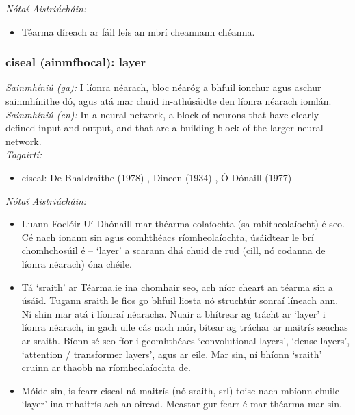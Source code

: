  \noindent \textit{Nótaí Aistriúcháin:}
\begin{itemize}
	\item Téarma díreach ar fáil leis an mbrí cheannann chéanna.
\end{itemize}


\subsubsection*{ciseal (ainmfhocal): layer}
 \noindent \textit{Sainmhíniú (ga):} I líonra néarach, bloc néaróg a bhfuil ionchur agus aschur sainmhínithe dó, agus atá mar chuid in-athúsáidte den líonra néarach iomlán.
\\
 \noindent \textit{Sainmhíniú (en):} In a neural network, a block of neurons that have clearly-defined input and output, and that are a building block of the larger neural network.
\\
 \noindent \textit{Tagairtí:}
\begin{itemize}
	\item ciseal: De Bhaldraithe (1978) \cite{de-bhaldraithe}, Dineen (1934) \cite{dineen}, Ó Dónaill (1977) \cite{odonaill}
\end{itemize}

 \noindent \textit{Nótaí Aistriúcháin:}
\begin{itemize}
	\item Luann Foclóir Uí Dhónaill mar théarma eolaíochta (sa mbitheolaíocht) é seo. Cé nach ionann sin agus comhthéacs ríomheolaíochta, úsáidtear le brí chomhchosúil é -- `layer' a scarann dhá chuid de rud (cill, nó codanna de líonra néarach) óna chéile.
	\item Tá `sraith' ar Téarma.ie ina chomhair seo, ach níor cheart an téarma sin a úsáid. Tugann sraith le fios go bhfuil liosta nó struchtúr sonraí líneach ann. Ní shin mar atá i líonraí néaracha. Nuair a bhítrear ag trácht ar `layer' i líonra néarach, in gach uile cás nach mór, bítear ag tráchar ar maitrís seachas ar sraith. Bíonn sé seo fíor i gcomhthéacs `convolutional layers', `dense layers', `attention / transformer layers', agus ar eile. Mar sin, ní bhíonn `sraith' cruinn ar thaobh na ríomheolaíochta de.
	\item Móide sin, is fearr ciseal ná maitrís (nó sraith, srl) toisc nach mbíonn chuile `layer' ina mhaitrís ach an oiread. Meastar gur fearr é mar théarma mar sin.
\end{itemize}


